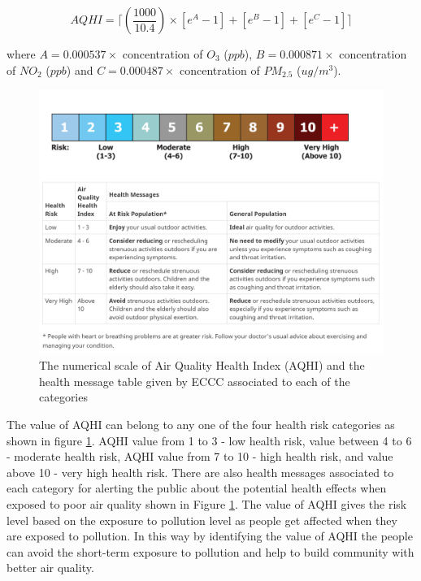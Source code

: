 \begin{equation}
AQHI = \lceil (\frac{1000}{10.4}) \times [e^A-1]+[e^B-1]+[e^C-1] \rceil
\end{equation}

where $ A = 0.000537 \times$ concentration of  $O_3$ ($ppb$), $B = 0.000871 \times$ concentration  of $NO_2$ ($ppb$) and  $C = 0.000487 \times$ concentration of $PM_{2.5}$ ($ug/m^3$).


\begin{figure}[h!]
  \begin{center}
  \includegraphics[scale=0.25]{./images/figure103.png}
  \end{center}
 
  \caption{The numerical scale of Air Quality Health Index (AQHI) and the health message table given by ECCC associated to each of the categories \cite{healthmess}} 
  
  \label{aqhi}
\end{figure}
\hspace{1 cm}





The value of AQHI can belong to any one of the four health risk categories as shown in figure \ref{aqhi}. AQHI value from 1 to 3 - low health risk, value between 4 to 6 - moderate health risk, AQHI value from 7 to 10 - high health risk, and value above 10 - very high health risk. There are also health messages associated to each category for alerting the public about the potential health effects when exposed to poor air quality shown in Figure \ref{aqhi}. The value of AQHI gives the risk level based on the exposure to pollution level as people get affected when they are exposed to pollution. In this way by identifying the value of AQHI the people can avoid the short-term exposure to pollution and help to build community with better air quality.  

